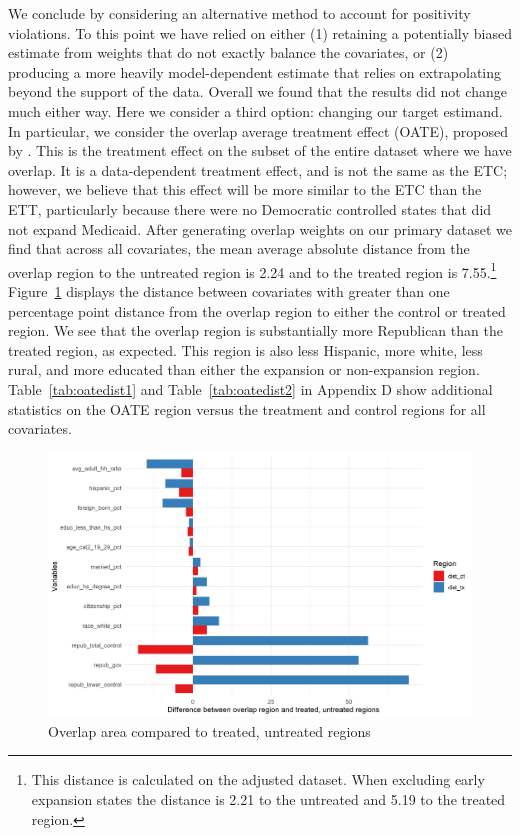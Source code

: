 \documentclass[aoas]{imsart}
\theoremstyle{plain}
\theoremstyle{remark}
\begin{document}
We conclude by considering an alternative method to account for positivity violations. To this point we have relied on either (1) retaining a potentially biased estimate from weights that do not exactly balance the covariates, or (2) producing a more heavily model-dependent estimate that relies on extrapolating beyond the support of the data. Overall we found that the results did not change much either way. Here we consider a third option: changing our target estimand. In particular, we consider the overlap average treatment effect (OATE), proposed by \cite{li2018balancing}. This is the treatment effect on the subset of the entire dataset where we have overlap. It is a data-dependent treatment effect, and is not the same as the ETC; however, we believe that this effect will be more similar to the ETC than the ETT, particularly because there were no Democratic controlled states that did not expand Medicaid. After generating overlap weights on our primary dataset we find that across all covariates, the mean average absolute distance from the overlap region to the untreated region is 2.24 and to the treated region is 7.55.\footnote{This distance is calculated on the adjusted dataset. When excluding early expansion states the distance is 2.21 to the untreated and 5.19 to the treated region.} Figure~\ref{fig:oateimbalance} displays the distance between covariates with greater than one percentage point distance from the overlap region to either the control or treated region. We see that the overlap region is substantially more Republican than the treated region, as expected. This region is also less Hispanic, more white, less rural, and more educated than either the expansion or non-expansion region. Table~\ref{tab:oatedist1} and Table~\ref{tab:oatedist2} in Appendix D show additional statistics on the OATE region versus the treatment and control regions for all covariates.

\begin{figure}[H]
\begin{center}
    \caption{Overlap area compared to treated, untreated regions}
    \label{fig:oateimbalance}
    \includegraphics[scale=0.6]{01_Plots/oate-imbalances-c1.png}
\end{center}
\end{figure}
\end{document}
